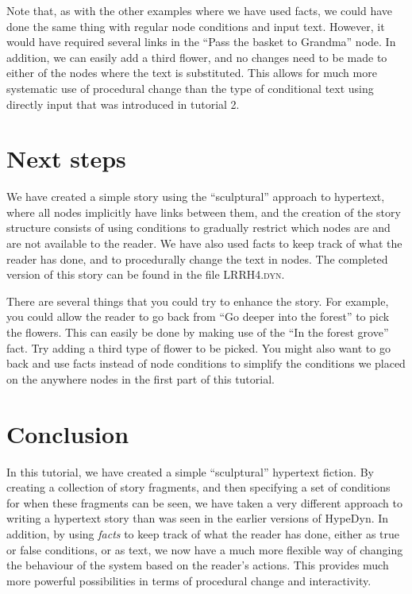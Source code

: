 \documentclass{article}
\begin{document}
Note that, as with the other examples where we have used facts, we could have done the same thing with regular node conditions and input text. However, it would have required several links in the ``Pass the basket to Grandma'' node. In addition, we can easily add a third flower, and no changes need to be made to either of the nodes where the text is substituted. This allows for much more systematic use of procedural change than the type of conditional text using directly input that was introduced in tutorial 2.

\section{Next steps}

We have created a simple story using the ``sculptural'' approach to hypertext, where all nodes implicitly have links between them, and the creation of the story structure consists of using conditions to gradually restrict which nodes are and are not available to the reader. We have also used facts to keep track of what the reader has done, and to procedurally change the text in nodes. The completed version of this story can be found in the file \textsc{LRRH4.dyn}.

There are several things that you could try to enhance the story. For example, you could allow the reader to go back from ``Go deeper into the forest'' to pick the flowers. This can easily be done by making use of the ``In the forest grove'' fact. Try adding a third type of flower to be picked. You might also want to go back and use facts instead of node conditions to simplify the conditions we placed on the anywhere nodes in the first part of this tutorial.

\section{Conclusion}

In this tutorial, we have created a simple ``sculptural'' hypertext fiction. By creating a collection of story fragments, and then specifying a set of conditions for when these fragments can be seen, we have taken a very different approach to writing a hypertext story than was seen in the earlier versions of HypeDyn. In addition, by using \textit{facts} to keep track of what the reader has done, either as true or false conditions, or as text, we now have a much more flexible way of changing the behaviour of the system based on the reader's actions. This provides much more powerful possibilities in terms of procedural change and interactivity.

% 

  
  
\end{document}
